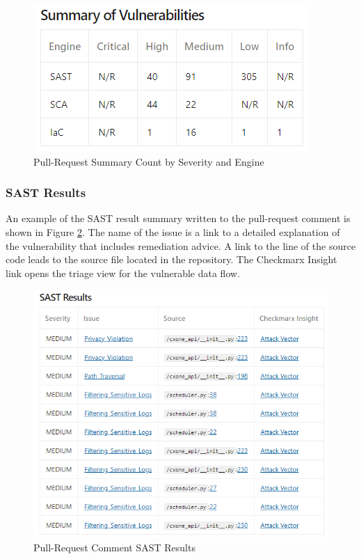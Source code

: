 \begin{figure}[ht]
    \includegraphics[width=\textwidth]{graphics/pr-summary.png}
    \caption{Pull-Request Summary Count by Severity and Engine}
    \label{fig:pr-summary}
\end{figure}


\subsubsection{SAST Results}

An example of the SAST result summary written to the pull-request comment
is shown in Figure
\ref{fig:pr-sast-section}.  The name of the issue is a link to a detailed
explanation of the vulnerability that includes remediation advice.  A
link to the line of the source code leads to the source file located in the
repository.  The Checkmarx Insight link opens the triage view for the vulnerable
data flow.

\begin{figure}[ht]
    \includegraphics[width=\textwidth]{graphics/pr-sast.png}
    \caption{Pull-Request Comment SAST Results}
    \label{fig:pr-sast-section}
\end{figure}

